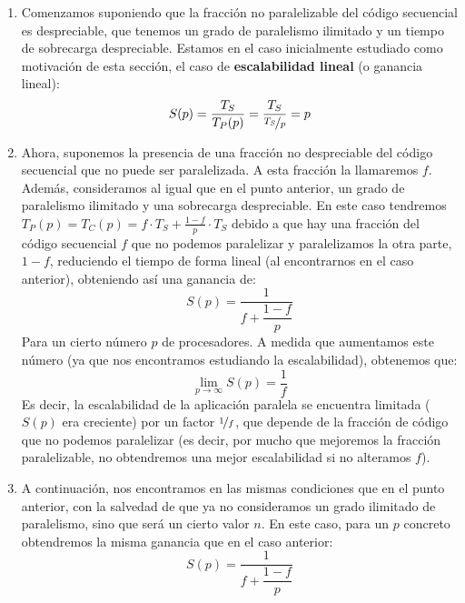 \begin{enumerate}
    \item Comenzamos suponiendo que la fracción no paralelizable del código secuencial es despreciable, que tenemos un grado de paralelismo ilimitado y un tiempo de sobrecarga despreciable. Estamos en el caso inicialmente estudiado como motivación de esta sección, el caso de \textbf{escalabilidad lineal} (o ganancia lineal):
        \begin{equation*}
            S(p) = \dfrac{T_S}{T_P(p)} = \dfrac{T_S}{\nicefrac{T_S}{p}} = p
        \end{equation*}
    \item Ahora, suponemos la presencia de una fracción no despreciable del código secuencial que no puede ser paralelizada. A esta fracción la llamaremos $f$. Además, consideramos al igual que en el punto anterior, un grado de paralelismo ilimitado y una sobrecarga despreciable. En este caso tendremos $T_P(p) = T_C(p) = f\cdot T_S + \frac{1-f}{p}\cdot T_S$ debido a que hay una fracción del código secuencial $f$ que no podemos paralelizar y paralelizamos la otra parte, $1-f$, reduciendo el tiempo de forma lineal (al encontrarnos en el caso anterior), obteniendo así una ganancia de:
        \begin{equation*}
            S(p) = \dfrac{1}{f+\dfrac{1-f}{p}}
        \end{equation*}
        Para un cierto número $p$ de procesadores. A medida que aumentamos este número (ya que nos encontramos estudiando la escalabilidad), obtenemos que:
        \begin{equation*}
            \lim_{p\to\infty}S(p) = \dfrac{1}{f}
        \end{equation*}
        Es decir, la escalabilidad de la aplicación paralela se encuentra limitada ($S(p)$ era creciente) por un factor $\nicefrac{1}{f}$, que depende de la fracción de código que no podemos paralelizar (es decir, por mucho que mejoremos la fracción paralelizable, no obtendremos una mejor escalabilidad si no alteramos $f$).
    \item A continuación, nos encontramos en las mismas condiciones que en el punto anterior, con la salvedad de que ya no consideramos un grado ilimitado de paralelismo, sino que será un cierto valor $n$. En este caso, para un $p$ concreto obtendremos la misma ganancia que en el caso anterior:
        \begin{equation*}
            S(p) = \dfrac{1}{f+\dfrac{1-f}{p}}
        \end{equation*}

\end{enumerate}
